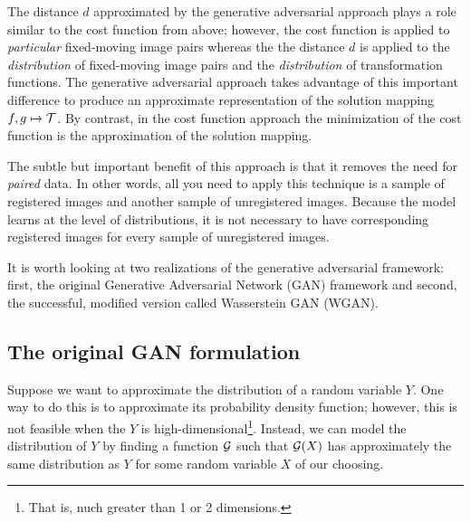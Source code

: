 \documentclass{article}
\begin{document}
	The distance \(d\) approximated by the generative adversarial approach plays a role similar to the cost function from above; however, the cost function is applied to \textit{particular} fixed-moving image pairs whereas the the distance \(d\) is applied to the \textit{distribution} of fixed-moving image pairs and the \textit{distribution} of transformation functions. The generative adversarial approach takes advantage of this important difference to produce an approximate representation of the solution mapping \(f,g \mapsto \mathcal{T}\). By contrast, in the cost function approach the minimization of the cost function is the approximation of the solution mapping.
	
	The subtle but important benefit of this approach is that it removes the need for \textit{paired} data. In other words, all you need to apply this technique is a sample of registered images and another sample of unregistered images. Because the model learns at the level of distributions, it is not necessary to have corresponding registered images for every sample of unregistered images.
	
	It is worth looking at two realizations of the generative adversarial framework: first, the original Generative Adversarial Network (GAN) framework and second, the successful, modified version called Wasserstein GAN (WGAN).
	
	\subsection{The original GAN formulation}
	Suppose we want to approximate the distribution of a random variable \(Y\). One way to do this is to approximate its probability density function; however, this is not feasible when the \(Y\) is high-dimensional\footnote{That is, nuch greater than 1 or 2 dimensions.}. Instead, we can model the distribution of \(Y\) by finding a function \(\mathcal{G}\) such that \(\mathcal{G}(X)\) has approximately the same distribution as \(Y\) for some random variable \(X\) of our choosing.
	
\end{document}
